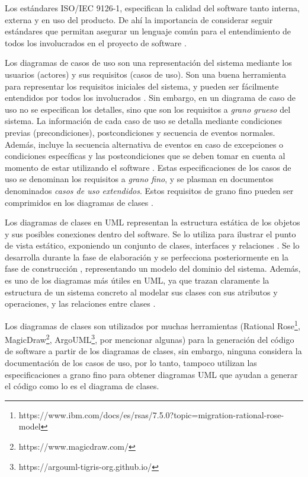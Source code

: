 Los estándares ISO/IEC 9126-1, especifican la calidad del software tanto interna, externa y en uso del producto. De ahí la importancia de considerar seguir estándares que permitan asegurar un lenguaje común para el entendimiento de todos los involucrados en el proyecto de software \parencite{Losavio2009}.

Los diagramas de casos de uso son una representación del sistema mediante los usuarios (actores) y sus requisitos (casos de uso). Son una buena herramienta para representar los requisitos iniciales del sistema, y pueden ser fácilmente entendidos por todos los involucrados \parencite{Zapata2008}. Sin embargo, en un diagrama de caso de uso no se especifican los detalles, sino que son los requisitos a \textit{grano grueso} del sistema. La información de cada caso de uso se detalla mediante condiciones previas (precondiciones), postcondiciones y secuencia de eventos normales. Además, incluye la secuencia alternativa de eventos en caso de excepciones o condiciones específicas y las postcondiciones que se deben tomar en cuenta al momento de estar utilizando el software \parencite{iqbal2020}. Estas especificaciones de los casos de uso se denominan los requisitos a \textit{grano fino}, y se plasman en documentos denominados \textit{casos de uso extendidos}. Estos requisitos de grano fino pueden ser comprimidos en los diagramas de clases \parencite{Abdelnabi2021}. 

Los diagramas de clases en UML representan la estructura estática de los objetos y sus posibles conexiones dentro del software. Se lo utiliza para ilustrar el punto de vista estático, exponiendo un conjunto de clases, interfaces y relaciones \parencite{abu2020}. Se lo desarrolla durante la fase de elaboración y se perfecciona posteriormente en la fase de construcción \parencite{Omg2009}, representando un modelo del dominio del sistema. Además, es uno de los diagramas más útiles en UML, ya que trazan claramente la estructura de un sistema concreto al modelar sus clases con sus atributos y operaciones, y las relaciones entre clases \parencite{abu2020}.

Los diagramas de clases son utilizados por muchas herramientas (Rational Rose\footnote{https://www.ibm.com/docs/es/rsas/7.5.0?topic=migration-rational-rose-model}, MagicDraw\footnote{https://www.magicdraw.com/}, ArgoUML\footnote{https://argouml-tigris-org.github.io/}, por mencionar algunas) para la generación del código de software a partir de los diagramas de clases, sin embargo, ninguna considera la documentación de los casos de uso, por lo tanto, tampoco utilizan las especificaciones a grano fino para obtener diagramas UML que ayudan a generar el código como lo es el diagrama de clases.

